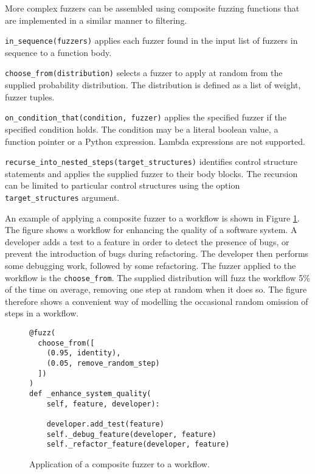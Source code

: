 \documentclass{sig-alternate}
\newenvironment{FunctionList}{%
\lstset{basicstyle=\ttfamily\bfseries\small}
\begin{list}{}{\leftmargin=5pt}
}{\end{list}\lstset{basicstyle=\ttfamily\small}}
\begin{document}

More complex fuzzers can be assembled using composite fuzzing functions that are
implemented in a similar manner to filtering.  


\begin{FunctionList}
\item \lstinline!in_sequence(fuzzers)! applies each fuzzer found in the input
  list of fuzzers in sequence to a function body.

\item \lstinline!choose_from(distribution)! selects a fuzzer to apply at random
  from the supplied probability distribution.  The distribution is defined as a
  list of weight, fuzzer tuples.

\item \lstinline!on_condition_that(condition, fuzzer)! %
  applies the specified fuzzer if the specified condition holds.  The condition
  may be a literal boolean value, a function pointer or a Python expression.
  Lambda expressions are not supported.

\item \lstinline!recurse_into_nested_steps(target_structures)! identifies
  control structure statements and applies the supplied fuzzer to their body
  blocks.  The recursion can be limited to particular control structures using
  the option \lstinline!target_structures! argument.
\end{FunctionList}

An example of applying a composite fuzzer to a workflow is shown in Figure
\ref{fig:composite}.  The figure shows a workflow for enhancing the quality of a
software system.  A developer adds a test to a feature in order to detect the
presence of bugs, or prevent the introduction of bugs during refactoring.  The
developer then performs some debugging work, followed by some refactoring.  The
fuzzer applied to the workflow is the \lstinline!choose_from!.  The supplied
distribution will fuzz the workflow 5\% of the time on average, removing one
step at random when it does so.  The figure therefore shows a convenient way of
modelling the occasional random omission of steps in a workflow.

\begin{figure}
  \centering

\begin{lstlisting}
@fuzz(
  choose_from([
    (0.95, identity),
    (0.05, remove_random_step)
  ])
)
def _enhance_system_quality(
    self, feature, developer):

    developer.add_test(feature)
    self._debug_feature(developer, feature)
    self._refactor_feature(developer, feature) 
\end{lstlisting}
  
  \caption{Application of a composite fuzzer to a workflow.}
  \label{fig:composite}
\end{figure}
\end{document}

